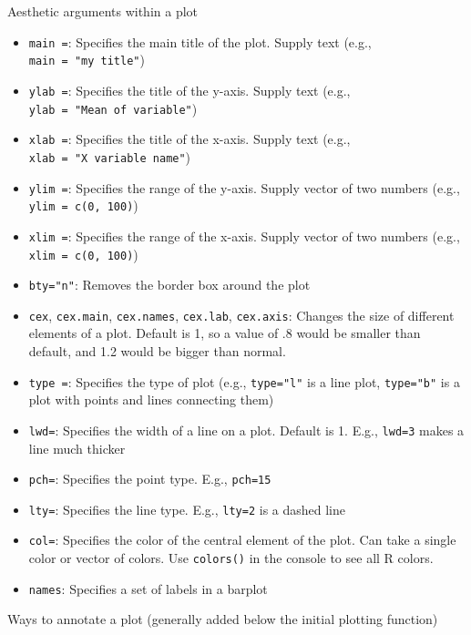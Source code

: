 \documentclass[
  letterpaper,
  DIV=11,
  numbers=noendperiod]{scrreprt}
\providecommand{\tightlist}{%
  \setlength{\itemsep}{0pt}\setlength{\parskip}{0pt}}\usepackage{longtable,booktabs,array}
\begin{document}
Aesthetic arguments within a plot

\begin{itemize}
\tightlist
\item
  \texttt{main\ =}: Specifies the main title of the plot. Supply text
  (e.g., \texttt{main\ =\ "my\ title"})
\item
  \texttt{ylab\ =}: Specifies the title of the y-axis. Supply text
  (e.g., \texttt{ylab\ =\ "Mean\ of\ variable"})
\item
  \texttt{xlab\ =}: Specifies the title of the x-axis. Supply text
  (e.g., \texttt{xlab\ =\ "X\ variable\ name"})
\item
  \texttt{ylim\ =}: Specifies the range of the y-axis. Supply vector of
  two numbers (e.g., \texttt{ylim\ =\ c(0,\ 100)})
\item
  \texttt{xlim\ =}: Specifies the range of the x-axis. Supply vector of
  two numbers (e.g., \texttt{xlim\ =\ c(0,\ 100)})
\item
  \texttt{bty="n"}: Removes the border box around the plot
\item
  \texttt{cex}, \texttt{cex.main}, \texttt{cex.names}, \texttt{cex.lab},
  \texttt{cex.axis}: Changes the size of different elements of a plot.
  Default is 1, so a value of .8 would be smaller than default, and 1.2
  would be bigger than normal.
\item
  \texttt{type\ =}: Specifies the type of plot (e.g., \texttt{type="l"}
  is a line plot, \texttt{type="b"} is a plot with points and lines
  connecting them)
\item
  \texttt{lwd=}: Specifies the width of a line on a plot. Default is 1.
  E.g., \texttt{lwd=3} makes a line much thicker
\item
  \texttt{pch=}: Specifies the point type. E.g., \texttt{pch=15}
\item
  \texttt{lty=}: Specifies the line type. E.g., \texttt{lty=2} is a
  dashed line
\item
  \texttt{col=}: Specifies the color of the central element of the plot.
  Can take a single color or vector of colors. Use \texttt{colors()} in
  the console to see all R colors.
\item
  \texttt{names}: Specifies a set of labels in a barplot
\end{itemize}

Ways to annotate a plot (generally added below the initial plotting
function)
\end{document}
